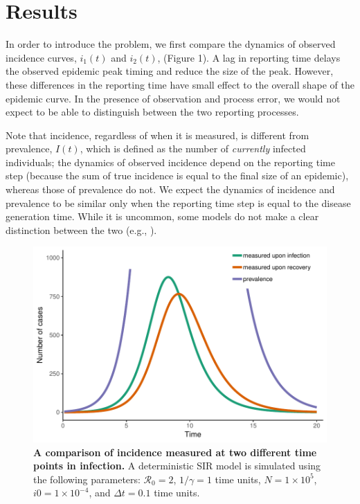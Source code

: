 \documentclass{article}\usepackage[]{graphicx}\usepackage[]{color}
\begin{document}
\section{Results}

In order to introduce the problem, we first compare the dynamics of observed 
incidence curves, $i_1(t)$ and $i_2(t)$, (Figure 1). A lag in reporting time delays
the observed epidemic peak timing and reduce the size of the peak. However, 
these differences in the reporting time have small effect to the overall shape 
of the epidemic curve. In the presence of observation and process error, we 
would not expect to be able to distinguish between the two reporting processes. 

Note that incidence, regardless of when it is measured, is different from prevalence,
$I(t)$, which is defined as the number of \emph{currently} infected individuals;
the dynamics of observed incidence depend on the reporting time step (because the sum of 
true incidence is equal to the final size of an epidemic), whereas those of
prevalence do not. We expect the dynamics of incidence and prevalence to be similar only when
the reporting time step is equal to the disease generation time. While it is
uncommon, some models do not make a clear distinction between the two (e.g., 
\cite{hooker2010parameterizing}).

\begin{figure}
\includegraphics[width=\textwidth]{../figure/example.pdf}
\caption{
\textbf{A comparison of incidence measured at two different time points in infection.}
A deterministic SIR model is simulated using the following parameters: 
$\mathcal R_0 = 2$, $1/\gamma = 1$ time units, $N = 1 \times 10^5$, $i0 = 1 \times 10^{-4}$,
and $\Delta t = 0.1$ time units.
}
\end{figure}
\end{document}
